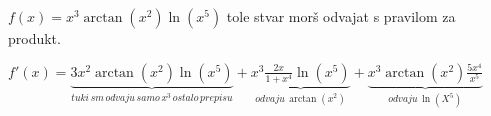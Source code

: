 \documentclass[a4paper]{article}
\begin{document}
$f(x)=x^3\arctan(x^2)\ln(x^5)$ tole stvar morš odvajat s pravilom za produkt.

$f'(x)=\underbrace{3x^2\arctan(x^2)\ln(x^5)}_{tuki\, sm\, odvaju\, samo\, x^3\, ostalo\, prepisu}+\underbrace{x^3\frac{2x}{1+x^4}\ln(x^5)}_{odvaju\,\arctan(x^2)}+\underbrace{x^3\arctan(x^2)\frac{5x^4}{x^5}}_{odvaju\, \ln(X^5)}$
\end{document}
